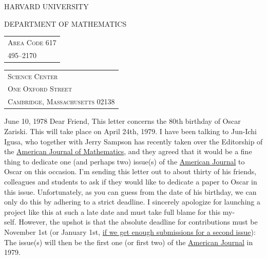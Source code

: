 HARVARD UNIVERSITY

DEPARTMENT OF MATHEMATICS
\begin{tabular}{l}
\textsc{Area Code 617}\\
495--2170
\end{tabular}
\begin{tabular}{l}
\textsc{Science Center}\\
\textsc{One Oxford Street}\\
\textsc{Cambridge, Massachusetts 02138}
\end{tabular}
June 10, 1978
Dear Friend,
This letter concerns the 80th birthday of Oscar Zariski. This will take place on April 24th, 1979. I have been talking to Jun-Ichi Igusa, who together with Jerry Sampson has recently taken over the Editorship of the \uline{American Journal of Mathematics}, and they agreed that it would be a fine thing to dedicate one (and perhaps two) issue(s) of the \uline{American Journal} to Oscar on this occasion. I'm sending this letter out to about thirty of his friends, colleagues and students to ask if they would like to dedicate a paper to Oscar in this issue. Unfortunately, as you can guess from the date of his birthday, we can only do this by adhering to a strict deadline. I sincerely apologize for launching a project like this at such a late date and must take full blame for this my-\\
self. However, the upshot is that the absolute deadline for contributions must be November 1st (or January 1st, \uline{if we get enough submissions for a second issue}): The issue(s) will then be the first one (or first two) of the \uline{American Journal} in 1979.
